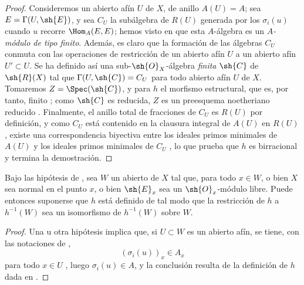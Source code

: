\documentclass[oneside,10pt]{amsart}
\newcommand{\oldpage}[2][]{\marginnote{\normalfont\footnotesize\textbf{#1}~|~#2}\ignorespaces}
\let\EGAOriginalLabel\label
\renewcommand{\label}[1]{\phantomsection\EGAOriginalLabel{#1}}
\begin{document}
\begin{proof}
Consideremos un abierto afín $U$ de $X$, de anillo $A(U)=A$;
sea $E=\Gamma(U,\sh{E})$, y sea $C_U$ la subálgebra de $R(U)$ generada por los $\sigma_i(u)$ cuando $u$ recorre $\Hom_A(E,E)$;
hemos visto en  que esta $A$-álgebra es un \emph{$A$-módulo de tipo finito}.
Además, es claro que la formación de las álgebras $C_U$ conmuta con las operaciones de restricción de un abierto afín $U$ a un abierto afín $U'\subset U$.
Se ha definido así una sub-$\sh{O}_X$-álgebra \emph{finita} $\sh{C}$ de $\sh{R}(X)$ tal que $\Gamma(U,\sh{C})=C_U$ para todo abierto afín $U$ de $X$.
\oldpage[II]{133}
Tomaremos $Z=\Spec(\sh{C})$, y para $h$ el morfismo estructural, que es, por tanto, finito ;
como $\sh{C}$ es reducida, $Z$ es un preesquema noetheriano reducido .
Finalmente, el anillo total de fracciones de $C_U$ es $R(U)$ por definición, y como $C_U$ está contenido en la clausura integral de $A(U)$ en $R(U)$, existe una correspondencia biyectiva entre los ideales primos minimales de $A(U)$ y los ideales primos minimales de $C_U$ \cite[t.~I, p.~259]{I-13}, lo que prueba que $h$ es birracional y termina la demostración.
\end{proof}

\begin{corollary}[6.6.7]
\label{II.6.6.7}
Bajo las hipótesis de , sea $W$ un abierto de $X$ tal que, para todo $x\in W$, o bien $X$ sea normal en el punto $x$, o bien $\sh{E}_x$ sea un $\sh{O}_x$-módulo libre.
Puede entonces suponerse que $h$ está definido de tal modo que la restricción de $h$ a $h^{-1}(W)$ sea un isomorfismo de $h^{-1}(W)$ sobre $W$.
\end{corollary}

\begin{proof}
Una u otra hipótesis implica que, si $U\subset W$ es un abierto afín, se tiene, con las notaciones de ,
\[
  (\sigma_i(u))_x\in A_x
\]
para todo $x\in U$ , luego $\sigma_i(u)\in A$, y la conclusión resulta de la definición de $h$ dada en .
\end{proof}
\end{document}
